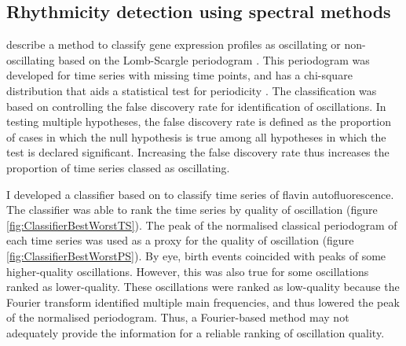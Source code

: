 \subsection{Rhythmicity detection using spectral methods}
\label{subsec:analysis-classification-spectral}



\citet{glynnDetectingPeriodicPatterns2006} describe a method to classify gene expression profiles as oscillating or non-oscillating based on the Lomb-Scargle periodogram \citep{lombLeastsquaresFrequencyAnalysis1976}.
This periodogram was developed for time series with missing time points, and has a chi-square distribution that aids a statistical test for periodicity \citep{scargleStudiesAstronomicalTime1982}.
The classification was based on controlling the false discovery rate for identification of oscillations.
In testing multiple hypotheses, the false discovery rate is defined as the proportion of cases in which the null hypothesis is true among all hypotheses in which the test is declared significant.
Increasing the false discovery rate thus increases the proportion of time series classed as oscillating.

I developed a classifier based on \citet{glynnDetectingPeriodicPatterns2006} to classify time series of flavin autofluorescence.
The classifier was able to rank the time series by quality of oscillation (figure \ref{fig:ClassifierBestWorstTS}).
The peak of the normalised classical periodogram of each time series was used as a proxy for the quality of oscillation (figure \ref{fig:ClassifierBestWorstPS}).
By eye, birth events coincided with peaks of some higher-quality oscillations.
However, this was also true for some oscillations ranked as lower-quality.
These oscillations were ranked as low-quality because the Fourier transform identified multiple main frequencies, and thus lowered the peak of the normalised periodogram.
Thus, a Fourier-based method may not adequately provide the information for a reliable ranking of oscillation quality.

